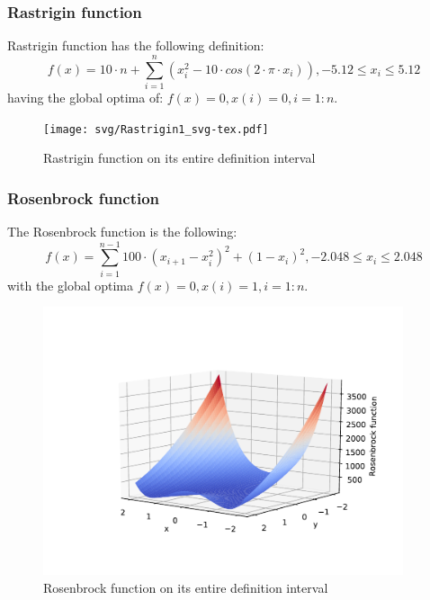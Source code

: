 \documentclass{article}
\begin{document}
\subsubsection{Rastrigin function}
Rastrigin function has the following definition:
$$f(x) = 10 \cdot n + \sum_{i=1}^n\left(x_i^2 - 10\cdot cos(2 \cdot \pi \cdot x_i)\right), -5.12 \leq x_i \leq 5.12$$
having the global optima of: $f(x) = 0, x(i) = 0, i = 1:n$. 
\begin{figure}[h!]
  \centering
  \texttt{[image: svg/Rastrigin1\_svg-tex.pdf]}
  \caption{Rastrigin function on its entire definition interval}
\end{figure}
\subsubsection{Rosenbrock function}
The Rosenbrock function is the following:
$$f(x) = \sum_{i=1}^{n-1}100\cdot\left(x_{i+1} - x_i^2\right)^2 + \left(1 - x_i\right)^2, -2.048 \leq x_i \leq 2.048$$
with the global optima $f(x) = 0, x(i) = 1, i = 1:n$.
\begin{figure}[h!]
  \centering
  \includegraphics[width = 300pt]{svg/Rosenbrock_svg-tex.pdf}
  \caption{Rosenbrock function on its entire definition interval}
\end{figure}
\end{document}
